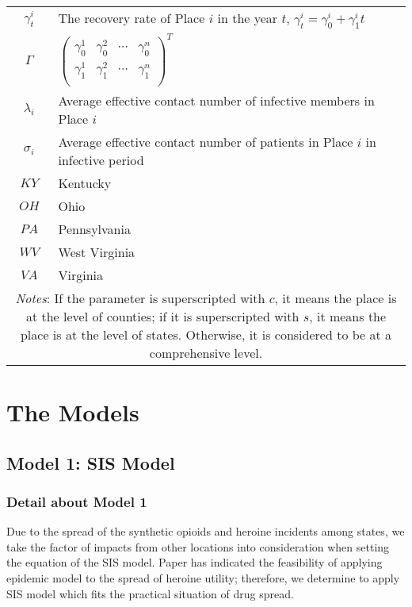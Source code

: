 \begin{table}[h]
\begin{center}
\begin{tabular}{cl}
			$\gamma_t^{i}$ &The recovery rate of Place $i$ in the year $t$, $\gamma_t^{i}=\gamma_0^{i}+\gamma_1^{i}t$\\
			$\varGamma$ &$\left( \begin{matrix}
	\gamma _{0}^{1}&		\gamma _{0}^{2}&		\cdots&		\gamma _{0}^{n}\\
	\gamma _{1}^{1}&		\gamma _{1}^{2}&		\cdots&		\gamma _{1}^{n}\\
\end{matrix} \right) ^T$\\
			$\lambda_i$ &Average effective contact number of infective members in Place $i$\\
			$\sigma_i$ &Average effective contact number of patients in Place $i$ in infective period\\
			$KY$&Kentucky\\
			$OH$&Ohio\\
			$PA$&Pennsylvania\\
			$WV$&West Virginia\\
			$VA$&Virginia\\
            \midrule
            \multicolumn{2}{m{15.2cm}}{\textit{Notes}: If the parameter is superscripted with $c$, it means the place is at the level of counties; if it is superscripted with $s$, it means the place is at the level of states. Otherwise, it is considered to be at a comprehensive level.}\\
            \bottomrule
        \end{tabular}\label{Ntt}
    \end{center}
\end{table}

\section{The Models}

\subsection{Model 1: SIS Model}
\subsubsection{Detail about Model 1}
Due to the spread of the synthetic opioids and heroine incidents among states, we take the factor of impacts from other locations into consideration when setting the equation of the SIS model. Paper \cite{6} has indicated the feasibility of applying epidemic model to the spread of heroine utility; therefore, we determine to apply SIS model which fits the practical situation of drug spread.

